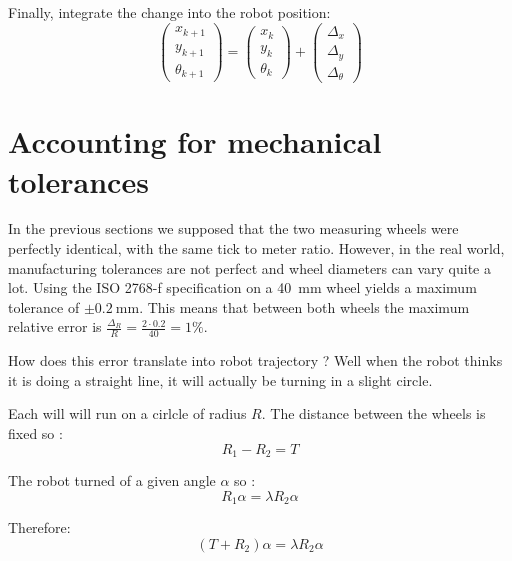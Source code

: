 \documentclass[a4paper]{IEEEtran}
\begin{document}
Finally, integrate the change into the robot position:
\begin{equation}
    \begin{pmatrix}
        x_{k+1}\\
        y_{k+1}\\
        \theta_{k+1}
    \end{pmatrix}
    =
    \begin{pmatrix}
        x_{k}\\
        y_{k}\\
        \theta_{k}
    \end{pmatrix}
    +
    \begin{pmatrix}
        \Delta_x\\\Delta_y\\\Delta_\theta
    \end{pmatrix}
\end{equation}


\section{Accounting for mechanical tolerances}
In the previous sections we supposed that the two measuring wheels were perfectly identical, with the same tick to meter ratio.
However, in the real world, manufacturing tolerances are not perfect and wheel diameters can vary quite a lot.
Using the ISO 2768-f specification on a \SI{40}{\milli\meter} wheel yields a maximum tolerance of $\pm \SI{0.2}{\milli\meter}$.
This means that between both wheels the maximum relative error is $\frac{\Delta_R}{R} = \frac{2 \cdot 0.2}{40} = 1\% $.

How does this error translate into robot trajectory ?
Well when the robot thinks it is doing a straight line, it will actually be turning in a slight circle.

Each will will run on a cirlcle of radius $R$.
The distance between the wheels is fixed so :
\begin{equation*}
    R_1 - R_2 = T
\end{equation*}

The robot turned of a given angle $\alpha$ so :
\begin{equation*}
    R_1 \alpha = \lambda R_2 \alpha
\end{equation*}

Therefore:
\begin{equation*}
    (T + R_2) \alpha = \lambda R_2 \alpha
\end{equation*}
\end{document}
